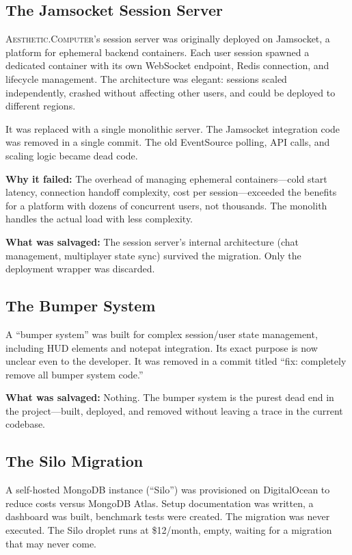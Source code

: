 \documentclass[10pt,letterpaper,twocolumn]{article}
\newcommand{\ac}{\textsc{Aesthetic.Computer}}
\begin{document}
\subsection{The Jamsocket Session Server}

\ac{}'s session server was originally deployed on Jamsocket, a platform for ephemeral backend containers. Each user session spawned a dedicated container with its own WebSocket endpoint, Redis connection, and lifecycle management. The architecture was elegant: sessions scaled independently, crashed without affecting other users, and could be deployed to different regions.

It was replaced with a single monolithic server. The Jamsocket integration code was removed in a single commit. The old EventSource polling, API calls, and scaling logic became dead code.

\textbf{Why it failed:} The overhead of managing ephemeral containers---cold start latency, connection handoff complexity, cost per session---exceeded the benefits for a platform with dozens of concurrent users, not thousands. The monolith handles the actual load with less complexity.

\textbf{What was salvaged:} The session server's internal architecture (chat management, multiplayer state sync) survived the migration. Only the deployment wrapper was discarded.

\subsection{The Bumper System}

A ``bumper system'' was built for complex session/user state management, including HUD elements and notepat integration. Its exact purpose is now unclear even to the developer. It was removed in a commit titled ``fix: completely remove all bumper system code.''

\textbf{What was salvaged:} Nothing. The bumper system is the purest dead end in the project---built, deployed, and removed without leaving a trace in the current codebase.

\subsection{The Silo Migration}

A self-hosted MongoDB instance (``Silo'') was provisioned on DigitalOcean to reduce costs versus MongoDB Atlas. Setup documentation was written, a dashboard was built, benchmark tests were created. The migration was never executed. The Silo droplet runs at \$12/month, empty, waiting for a migration that may never come.
\end{document}

